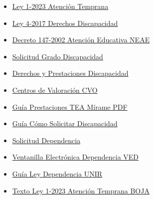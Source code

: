 \documentclass[a4paper,12pt]{article}
\begin{document}
\begin{itemize}
\item \href{https://www.juntadeandalucia.es/boja/2023/36/1}{Ley 1-2023 Atención Temprana}

\item \href{https://www.rpdiscapacidad.gob.es/docs/Res_TEA.pdf}{Ley 4-2017 Derechos Discapacidad}

\item \href{https://www.juntadeandalucia.es/organismos/desarrolloeducativoyformacionprofesional/areas/centros-educativos/atencion-diversidad.html}{Decreto 147-2002 Atención Educativa NEAE}

\item \href{https://www.juntadeandalucia.es/servicios/sede/tramites/procedimientos/detalle/69.html}{Solicitud Grado Discapacidad}

\item \href{https://www.juntadeandalucia.es/organismos/saludyconsumo/areas/salud-vida/adulta/paginas/ive-discapacidad.html}{Derechos y Prestaciones Discapacidad}

\item \href{https://www.juntadeandalucia.es/organismos/inclusionsocialjuventudfamiliaseigualdad/areas/discapacidad/cvo.html}{Centros de Valoración CVO}

\item \href{https://www.mirame.org/main/wp-content/uploads/2022/01/prestaciones-servicios-TEA.pdf}{Guía Prestaciones TEA Mírame PDF}

\item \href{https://andaluciainforma.eldiario.es/tramites/como-solicitar-de-forma-correcta-el-reconocimiento-del-grado-de-discapacidad-en-andalucia/}{Guía Cómo Solicitar Discapacidad}

\item \href{https://www.juntadeandalucia.es/organismos/inclusionsocialjuventudfamiliaseigualdad/areas/dependencia/solicitud.html}{Solicitud Dependencia}

\item \href{https://www.juntadeandalucia.es/servicios/sede/ventanillas/dependencia.html}{Ventanilla Electrónica Dependencia VED}

\item \href{https://www.unir.net/educacion/revista/noticias/como-solicitar-ley-dependencia-andalucia/}{Guía Ley Dependencia UNIR}

\item \href{https://www.juntadeandalucia.es/boja/2023/36/1}{Texto Ley 1-2023 Atención Temprana BOJA}


\end{itemize}
\end{document}

